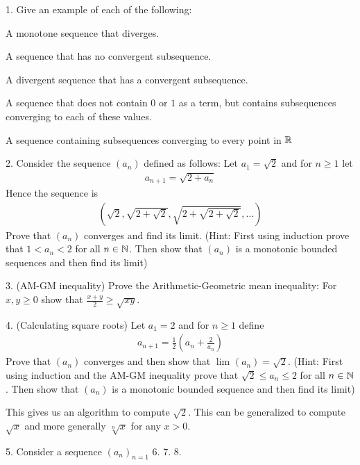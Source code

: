 
1. Give an example of each of the following:
\begin{alphabetize}
	\item A monotone sequence that diverges.
	\item A sequence that has no convergent subsequence.
	\item A divergent sequence that has a convergent subsequence.
	\item A sequence that does not contain $0$ or $1$ as a term, but contains subsequences converging to each of these values.
	\item A sequence containing subsequences converging to every point in $\mathbb{R}$
\end{alphabetize}
2. Consider the sequence $\left( a_n \right) $ defined as follows: Let $a_1 = \sqrt{2} $ and for $n \ge 1$ let 
	\begin{align}
		a_{n+1} = \sqrt{2 + a_n} 
	\end{align}
Hence the sequence is
	\begin{align}
		\left( \sqrt{2}, \sqrt{2 + \sqrt{2}}, \sqrt{2 + \sqrt{2 + \sqrt{2} } }, \ldots \right) 
	\end{align}
Prove that $\left( a_n \right) $ converges and find its limit. (Hint: First using induction prove that $1 < a_n < 2$ for all $n \in \mathbb{N}$. Then show that $\left( a_n \right) $ is a monotonic bounded sequences and then find its limit)

3. (AM-GM inequality) Prove the Arithmetic-Geometric mean inequality: For $x, y \ge 0$ show that $\frac{x+y}{2} \ge \sqrt{xy} $.

4. (Calculating square roots) Let $a_1 = 2 $ and for $n \ge 1$ define
	\begin{align}
		a_{n+1} = \frac{1}{2} \left( a_n + \frac{2}{a_n} \right) 
	\end{align}
Prove that $\left( a_n \right) $ converges and then show that $\lim_{}\left( a_n \right) = \sqrt{2} $. (Hint: First using induction and the AM-GM inequality prove that $\sqrt{2} \le a_n \le 2$ for all $n \in  \mathbb{N}$. Then show that $\left( a_n \right) $ is a monotonic bounded sequence and then find its limit)

\begin{remark}
	This gives us an algorithm to compute $\sqrt{2} $. This can be generalized to compute $\sqrt{x} $ and more generally $\sqrt[n]{x}$ for any $x > 0$. 
\end{remark}


5. Consider a sequence $\left( a_n \right)_{n=1}^{}$ 
6.
7.
8.

